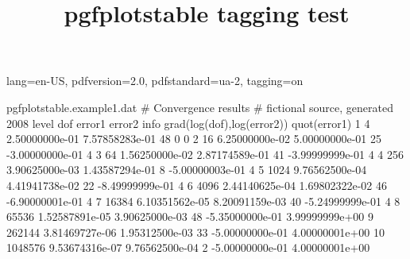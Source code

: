 \DocumentMetadata
  {
    lang=en-US,
    pdfversion=2.0,
    pdfstandard=ua-2,
    tagging=on
  }
\begin{filecontents*}{pgfplotstable.example1.dat}
# Convergence results
# fictional source, generated 2008
level dof error1 error2 info grad(log(dof),log(error2)) quot(error1)
1 4 2.50000000e-01 7.57858283e-01 48 0 0
2 16 6.25000000e-02 5.00000000e-01 25 -3.00000000e-01 4
3 64 1.56250000e-02 2.87174589e-01 41 -3.99999999e-01 4
4 256 3.90625000e-03 1.43587294e-01 8 -5.00000003e-01 4
5 1024 9.76562500e-04 4.41941738e-02 22 -8.49999999e-01 4
6 4096 2.44140625e-04 1.69802322e-02 46 -6.90000001e-01 4
7 16384 6.10351562e-05 8.20091159e-03 40 -5.24999999e-01 4
8 65536 1.52587891e-05 3.90625000e-03 48 -5.35000000e-01 3.99999999e+00
9 262144 3.81469727e-06 1.95312500e-03 33 -5.00000000e-01 4.00000001e+00
10 1048576 9.53674316e-07 9.76562500e-04 2 -5.00000000e-01 4.00000001e+00
\end{filecontents*}

\documentclass{article}
\usepackage{pgfplotstable,booktabs}
\pgfplotsset{compat=newest}
\ifdefined\Uchar\usepackage{unicode-math}\fi

\title{pgfplotstable tagging test}




\bigskip

         

